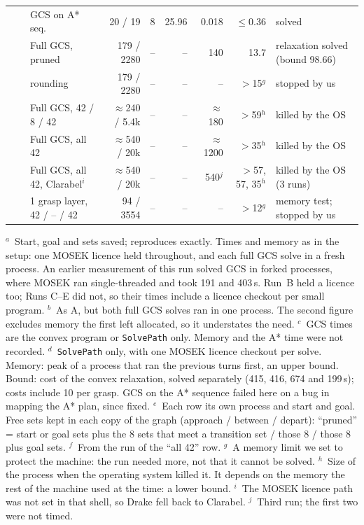 \begin{table}[t]
\begin{tabular}{@{}l r l r r r r r l@{}}
 & & GCS on A* seq. & 20 / 19 & 8 & 25.96 & 0.018 & $\le$0.36 & solved\\
 & & Full GCS, pruned & 179 / 2280 & -- & -- & 140 & 13.7 & relaxation solved (bound 98.66)\\
 & & \quad rounding & 179 / 2280 & -- & -- & -- & $>$15$^{g}$ & stopped by us\\
 & & Full GCS, 42 / 8 / 42 & $\approx$240 / 5.4k & -- & -- & $\approx$180 & $>$59$^{h}$ & killed by the OS\\
 & & Full GCS, all 42 & $\approx$540 / 20k & -- & -- & $\approx$1200 & $>$35$^{h}$ & killed by the OS\\
 & & Full GCS, all 42, Clarabel$^{i}$ & $\approx$540 / 20k & -- & -- & 540$^{j}$ & $>$57, 57, 35$^{h}$ & killed by the OS (3 runs)\\
 & & 1 grasp layer, 42 / -- / 42 & 94 / 3554 & -- & -- & -- & $>$12$^{g}$ & memory test; stopped by us\\
\bottomrule
\end{tabular}

\vspace{2pt}
\begin{minipage}{\textwidth}
\footnotesize
$^{a}$~Start, goal and sets saved; reproduces exactly. Times and memory as in
the setup: one MOSEK licence held throughout, and each full GCS solve in a
fresh process. An earlier measurement of this run solved GCS in forked
processes, where MOSEK ran single-threaded and took 191 and 403\,s.
Run~B held a licence too; Runs C--E did not, so their times include a licence
checkout per small program.
$^{b}$~As A, but both full GCS solves ran in one process. The second figure
excludes memory the first left allocated, so it understates the need.
$^{c}$~GCS times are the convex program or \texttt{SolvePath} only. Memory and
the A* time were not recorded.
$^{d}$~\texttt{SolvePath} only, with one MOSEK licence checkout per solve.
Memory: peak of a process that ran the previous turns first, an upper bound.
Bound: cost of the convex relaxation, solved separately (415, 416, 674 and
199\,s); costs include 10 per grasp. GCS on the A* sequence failed here on a
bug in mapping the A* plan, since fixed.
$^{e}$~Each row its own process and start and goal. Free sets kept in each
copy of the graph (approach / between / depart): ``pruned'' = start or goal
sets plus the 8 sets that meet a transition set / those 8 / those 8 plus goal
sets.
$^{f}$~From the run of the ``all 42'' row.
$^{g}$~A memory limit we set to protect the machine: the run needed more, not
that it cannot be solved.
$^{h}$~Size of the process when the operating system killed it. It depends on
the memory the rest of the machine used at the time: a lower bound.
$^{i}$~The MOSEK licence path was not set in that shell, so Drake fell back to
Clarabel.
$^{j}$~Third run; the first two were not timed.
\end{minipage}
\end{table}
